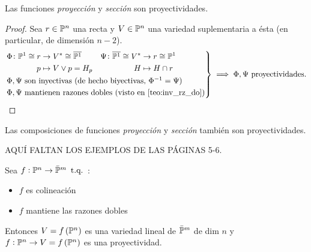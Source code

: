 \begin{col}
	Las funciones \textit{proyección} y \textit{sección} son proyectividades.
\end{col}
\begin{proof}
	Sea $r \in \mathbb{P}^n$ una recta y $V \in \mathbb{P}^n$ una variedad suplementaria a ésta
	(en particular, de dimensión $n-2$).
	\[
		\begin{rcases}
			\begin{aligned}
			\Phi \colon \mathbb{P}^1 \cong r &\to V^\ast \cong \overline{\mathbb{P}^1} \\
			p &\mapsto V \vee p = H_p
			\end{aligned}
			\quad
			\begin{aligned}
			\Psi \colon \overline{\mathbb{P}^1} \cong V^* &\to r \cong \mathbb{P}^1 \\ H &\mapsto H \cap r
			\end{aligned} \\
			\Phi, \Psi \text{ son inyectivas (de hecho biyectivas, } \Phi^{-1} = \Psi
			\text{)}\\
			\Phi, \Psi \text{ mantienen razones dobles (visto en \ref{teo:inv_rz_do})}
	\end{rcases}
	\implies
	\Phi, \Psi \text{ proyectividades.}
 \]
\end{proof}
\begin{obs}
	Las composiciones de funciones \textit{proyección} y \textit{sección} también son proyectividades.
\end{obs}
\begin{example} %
	AQUÍ FALTAN LOS EJEMPLOS DE LAS PÁGINAS 5-6.
\end{example}
\begin{prop} \label{prop:demo_teo2}
	Sea $f : \mathbb{P}^n \to \bar{\mathbb{P}}^m \operatorname{\text{ t.q. }}$:
	\begin{itemize}
		\item $f$ es colineación
		\item $f$ mantiene las razones dobles
	\end{itemize}
	Entonces $V = f \left( \mathbb{P}^n \right)$ es una variedad lineal de $\bar{\mathbb{P}}^m$ de dim $n$ y $f : \mathbb{P}^n \to V = f \left( \mathbb{P}^n \right)$ es una proyectividad.
\end{prop}
